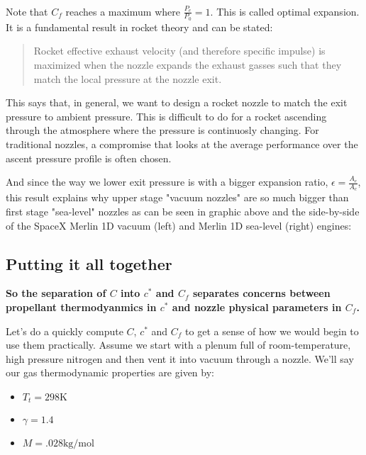 \documentclass[11pt]{article}
\providecommand{\tightlist}{%
      \setlength{\itemsep}{0pt}\setlength{\parskip}{0pt}}
\begin{document}
    \begin{center}
    \end{center}
    { \hspace*{\fill} \\}
    
    Note that \(C_f\) reaches a maximum where \(\frac{P_e}{P_0} = 1\). This
is called optimal expansion. It is a fundamental result in rocket theory
and can be stated:

\begin{quote}
Rocket effective exhaust velocity (and therefore specific impulse) is
maximized when the nozzle expands the exhaust gasses such that they
match the local pressure at the nozzle exit.
\end{quote}

This says that, in general, we want to design a rocket nozzle to match
the exit pressure to ambient pressure. This is difficult to do for a
rocket ascending through the atmosphere where the pressure is
continuosly changing. For traditional nozzles, a compromise that looks
at the average performance over the ascent pressure profile is often
chosen.

And since the way we lower exit pressure is with a bigger expansion
ratio, \(\epsilon = \frac{A_e}{A_c}\), this result explains why upper
stage "vacuum nozzles" are so much bigger than first stage "sea-level"
nozzles as can be seen in graphic above and the side-by-side of the
SpaceX Merlin 1D vacuum (left) and Merlin 1D sea-level (right) engines:

\subsection{Putting it all together}\label{putting-it-all-together}

\textbf{So the separation of \(C\) into \(c^*\) and \(C_f\) separates
concerns between propellant thermodyanmics in \(c^*\) and nozzle
physical parameters in \(C_f\).}

Let's do a quickly compute \(C\), \(c^*\) and \(C_f\) to get a sense of
how we would begin to use them practically. Assume we start with a
plenum full of room-temperature, high pressure nitrogen and then vent it
into vacuum through a nozzle. We'll say our gas thermodynamic properties
are given by:

\begin{itemize}
\tightlist
\item
  \(T_t = 298 \text{K}\)
\item
  \(\gamma = 1.4\)
\item
  \(M = .028 \text{kg/mol}\)
\end{itemize}
\end{document}
